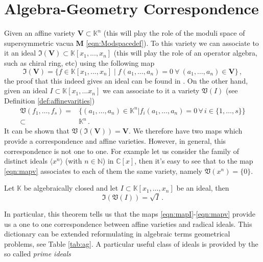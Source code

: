 \documentclass[main.tex]{subfiles}
\begin{document}
\section{Algebra-Geometry Correspondence}
Given an affine variety $\mathbf{V} \subset \mathbb{K}^{n}$ (this will play the role of the moduli space of supersymmetric vacua $\mathbf{M}$ \eqref{eqn:Modspacedef}). To this variety we can associate to it an ideal $\mathfrak{I}(\mathbf{V}) \subset \mathbb{K}[x_1,...,x_n]$ (this will play the role of an operator algebra, such as chiral ring, etc) using the following map 
\begin{equation}
\label{eqn:mapI}
\mathfrak{I}(\mathbf{V}) = \{ f \in \mathbb{K}[x_1,...,x_n] \mid f(a_1,\dots,a_n) = 0 \ \forall \ (a_1,\dots,a_n) \in \mathbf{V} \}\, ,
\end{equation}
the proof that this indeed gives an ideal can be found in \cite{Cox:2007}.
On the other hand, given an ideal $I \subset \mathbb{K}[x_1,...x_n]$ we can associate to it a variety $\mathfrak{V}(I)$ (see Definition \ref{def:affinevarities})
\begin{equation}\label{eqn:mapv}
\begin{aligned}
\mathfrak{V}(f_1,\dots,f_s)=&\{(a_1,\dots,a_n)\in \mathbb{K}^n|f_i(a_1,\dots,a_n)=0\,\forall \,i\in\{1,\dots,s\}\}\\
\subset &\mathbb{K}^n\,.
\end{aligned}
\end{equation}
It can be shown that $\mathfrak{V}(\mathfrak{I}(\mathbf{V}))=\mathbf{V}$.
We therefore have two maps which provide a correspondence and affine varieties. However, in general, this correspondence is not one to one. For example let us consider the family of distinct ideals $\langle x^n \rangle$ (with $n \in \mathbb{N}$) in $\mathbb{C}[x]$, then it's easy to see that to the map \eqref{eqn:mapv} associates to each of them the same variety, namely $\mathfrak{V}(x^n) = \{0\}$. 
\begin{theorem}
Let $\mathbb{K}$ be algebraically closed and let $I\subset \mathbb{K}[x_1,\dots,x_n]$ be an ideal, then
\begin{equation}
\mathfrak{I}(\mathfrak{V}(I)) = \sqrt{I}\, .
\end{equation} 
\end{theorem}
In particular, this theorem tells us that the maps \eqref{eqn:mapI}-\eqref{eqn:mapv} provide us a one to one correspondence between affine varieties and radical ideals. This dictionary can be extended reformulating in algebraic terms geometrical problems, see Table \ref{tab:ag}. A particular useful class of ideals is provided by the so called \textit{prime ideals}
\end{document}
